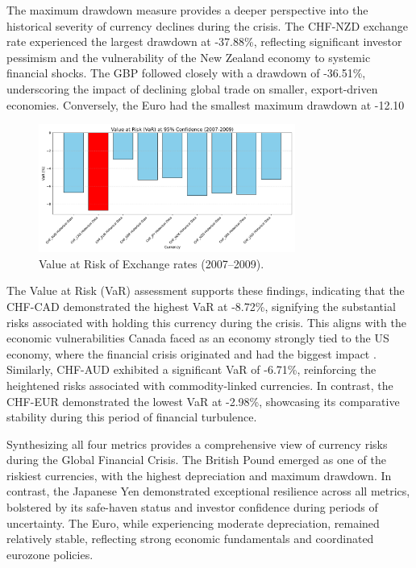 \documentclass[11pt,a4paper,english,oneside]{book}
\begin{document}
The maximum drawdown measure provides a deeper perspective into the historical severity of currency declines during the crisis. The CHF-NZD exchange rate experienced the largest drawdown at -37.88\%, reflecting significant investor pessimism and the vulnerability of the New Zealand economy to systemic financial shocks. The GBP followed closely with a drawdown of -36.51\%, underscoring the impact of declining global trade on smaller, export-driven economies. Conversely, the Euro had the smallest maximum drawdown at -12.10%

\begin{figure}[h!]
    \centering
    \includegraphics[width=0.75\textwidth]{images/var_2007_2009.pdf}
    \caption{Value at Risk of Exchange rates (2007--2009).}
    \label{fig:var_2007_2009}
\end{figure}

The Value at Risk (VaR) assessment supports these findings, indicating that the CHF-CAD demonstrated the highest VaR at -8.72\%, signifying the substantial risks associated with holding this currency during the crisis. This aligns with the economic vulnerabilities Canada faced as an economy strongly tied to the US economy, where the financial crisis originated and had the biggest impact \parencite{claessens2010cross}. Similarly, CHF-AUD exhibited a significant VaR of -6.71\%, reinforcing the heightened risks associated with commodity-linked currencies. In contrast, the CHF-EUR demonstrated the lowest VaR at -2.98\%, showcasing its comparative stability during this period of financial turbulence.

Synthesizing all four metrics provides a comprehensive view of currency risks during the Global Financial Crisis. The British Pound emerged as one of the riskiest currencies, with the highest depreciation and maximum drawdown. In contrast, the Japanese Yen demonstrated exceptional resilience across all metrics, bolstered by its safe-haven status and investor confidence during periods of uncertainty. The Euro, while experiencing moderate depreciation, remained relatively stable, reflecting strong economic fundamentals and coordinated eurozone policies.
\end{document}
